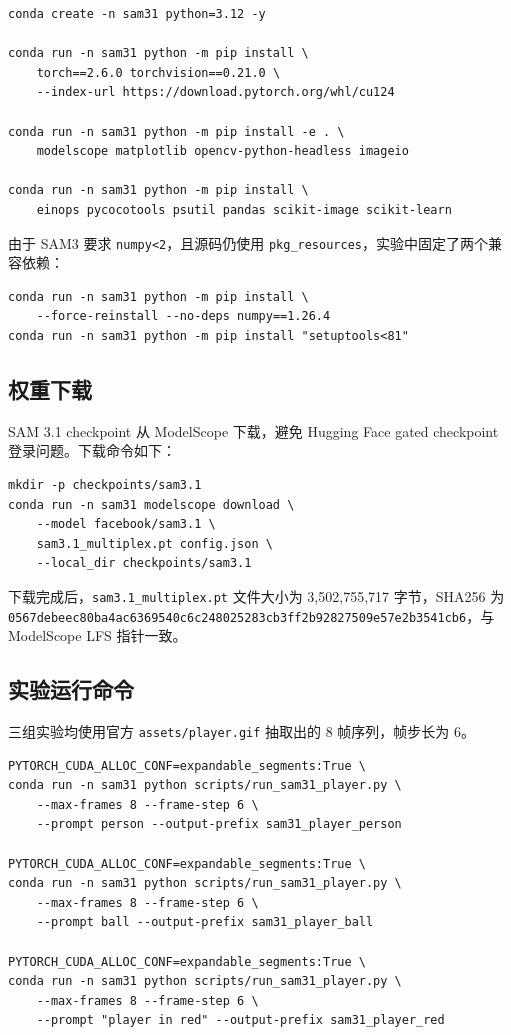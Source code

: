 \documentclass[UTF8,a4paper,zihao=-4,fontset=none]{ctexart}
\begin{document}
\begin{lstlisting}[style=shellcode,caption={环境配置命令摘录}]
conda create -n sam31 python=3.12 -y

conda run -n sam31 python -m pip install \
    torch==2.6.0 torchvision==0.21.0 \
    --index-url https://download.pytorch.org/whl/cu124

conda run -n sam31 python -m pip install -e . \
    modelscope matplotlib opencv-python-headless imageio

conda run -n sam31 python -m pip install \
    einops pycocotools psutil pandas scikit-image scikit-learn
\end{lstlisting}

由于 SAM3 要求 \texttt{numpy<2}，且源码仍使用 \texttt{pkg\_resources}，实验中固定了两个兼容依赖：

\begin{lstlisting}[style=shellcode,caption={兼容依赖固定}]
conda run -n sam31 python -m pip install \
    --force-reinstall --no-deps numpy==1.26.4
conda run -n sam31 python -m pip install "setuptools<81"
\end{lstlisting}

\subsection{权重下载}

SAM 3.1 checkpoint 从 ModelScope 下载，避免 Hugging Face gated checkpoint 登录问题。下载命令如下：

\begin{lstlisting}[style=shellcode,caption={ModelScope 权重下载命令}]
mkdir -p checkpoints/sam3.1
conda run -n sam31 modelscope download \
    --model facebook/sam3.1 \
    sam3.1_multiplex.pt config.json \
    --local_dir checkpoints/sam3.1
\end{lstlisting}

下载完成后，\texttt{sam3.1\_multiplex.pt} 文件大小为 3,502,755,717 字节，SHA256 为 \texttt{0567debeec80ba4ac6369540c6c248025283cb3ff2b92827509e57e2b3541cb6}，与 ModelScope LFS 指针一致。

\subsection{实验运行命令}

三组实验均使用官方 \texttt{assets/player.gif} 抽取出的 8 帧序列，帧步长为 6。

\begin{lstlisting}[style=shellcode,caption={三组视频 prompt 实验命令}]
PYTORCH_CUDA_ALLOC_CONF=expandable_segments:True \
conda run -n sam31 python scripts/run_sam31_player.py \
    --max-frames 8 --frame-step 6 \
    --prompt person --output-prefix sam31_player_person

PYTORCH_CUDA_ALLOC_CONF=expandable_segments:True \
conda run -n sam31 python scripts/run_sam31_player.py \
    --max-frames 8 --frame-step 6 \
    --prompt ball --output-prefix sam31_player_ball

PYTORCH_CUDA_ALLOC_CONF=expandable_segments:True \
conda run -n sam31 python scripts/run_sam31_player.py \
    --max-frames 8 --frame-step 6 \
    --prompt "player in red" --output-prefix sam31_player_red
\end{lstlisting}
\end{document}
